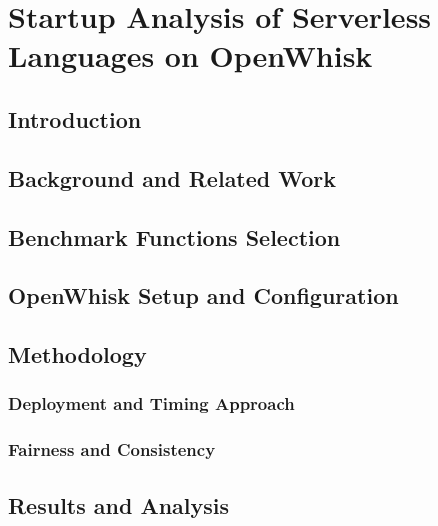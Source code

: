 \chapter{Startup Analysis of Serverless Languages on OpenWhisk}
\etocsettocstyle{\rule{\textwidth}{1pt}}{\rule{\textwidth}{1pt}} %
\localtableofcontents
\label{chap:cold_start_analysis}

\section{Introduction}
\label{sec:introduction_cold_start_analysis}

\section{Background and Related Work}
\label{sec:background_and_related_work}

\section{Benchmark Functions Selection}
\label{sec:benchmark_functions_selection}

\section{OpenWhisk Setup and Configuration}
\label{sec:openwhisk_setup_and_configuration}

\section{Methodology}
\label{sec:methodology}

\subsection{Deployment and Timing Approach}
\label{subsec:deployment_and_timing_approach}

\subsection{Fairness and Consistency}
\label{subsec:fairness_and_consistency}

\section{Results and Analysis}
\label{sec:results_and_analysis}

